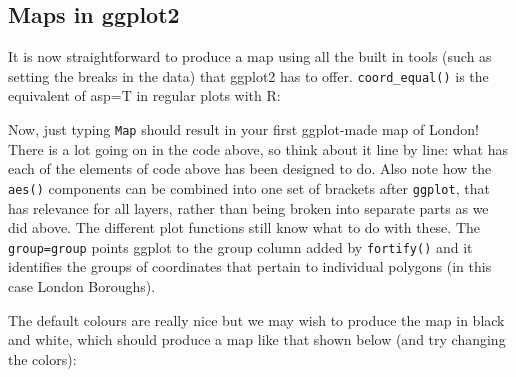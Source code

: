 \documentclass[]{article}
\newenvironment{Shaded}{}{}
\newcommand{\KeywordTok}[1]{\textcolor[rgb]{0.00,0.44,0.13}{\textbf{{#1}}}}
\newcommand{\DataTypeTok}[1]{\textcolor[rgb]{0.56,0.13,0.00}{{#1}}}
\newcommand{\StringTok}[1]{\textcolor[rgb]{0.25,0.44,0.63}{{#1}}}
\newcommand{\NormalTok}[1]{{#1}}
\begin{document}
\subsection{Maps in ggplot2}

It is now straightforward to produce a map using all the built in tools
(such as setting the breaks in the data) that ggplot2 has to offer.
\texttt{coord\_equal()} is the equivalent of asp=T in regular plots with
R:

\begin{Shaded}
\end{Shaded}
Now, just typing \texttt{Map} should result in your first ggplot-made
map of London! There is a lot going on in the code above, so think about
it line by line: what has each of the elements of code above has been
designed to do. Also note how the \texttt{aes()} components can be
combined into one set of brackets after \texttt{ggplot}, that has
relevance for all layers, rather than being broken into separate parts
as we did above. The different plot functions still know what to do with
these. The \texttt{group=group} points ggplot to the group column added
by \texttt{fortify()} and it identifies the groups of coordinates that
pertain to individual polygons (in this case London Boroughs).

The default colours are really nice but we may wish to produce the map
in black and white, which should produce a map like that shown below
(and try changing the colors):
\end{document}
